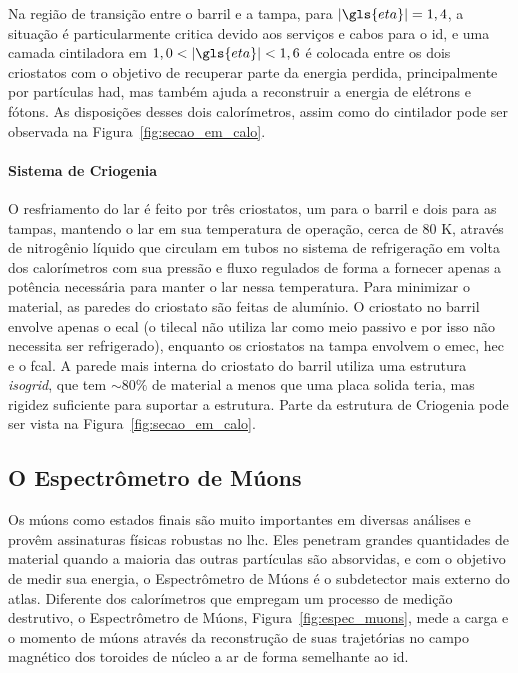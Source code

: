 Na região de transição entre o barril e a tampa, para
$|\gls{eta}| = 1,4$, a situação é particularmente critica devido aos serviços e
cabos para o \gls{id}, e uma camada cintiladora em $1,0<|\gls{eta}|<1,6$ 
é colocada entre os dois criostatos com o objetivo de recuperar parte 
da energia perdida, principalmente por
partículas \gls{had}, mas também ajuda a reconstruir a energia de elétrons e
fótons. As disposições desses dois calorímetros, assim como do cintilador pode 
ser observada na Figura~\ref{fig:secao_em_calo}. 


\paragraph{Sistema de Criogenia}
\label{par:cal_criogenia}

O resfriamento do \gls{lar} é feito por três criostatos, 
um para o barril e dois para as tampas, mantendo o \gls{lar} em sua temperatura
de operação, cerca de 80 K, através de nitrogênio líquido que circulam em tubos
no sistema de refrigeração em volta dos calorímetros com sua pressão e fluxo
regulados de forma a fornecer apenas a potência necessária para manter o
\gls{lar} nessa temperatura. Para minimizar o material, as paredes do criostato
são feitas de alumínio. O criostato no barril envolve apenas o
\gls{ecal} (o \gls{tilecal} não utiliza \gls{lar} como meio passivo e por
isso não necessita ser refrigerado), enquanto os criostatos na tampa envolvem o \gls{emec},
\gls{hec} e o \gls{fcal}. A parede mais interna do criostato do
barril utiliza uma estrutura \emph{isogrid}, que tem $\sim80\%$ de material a
menos que uma placa solida teria, mas rigidez suficiente para suportar a
estrutura. Parte da estrutura de Criogenia pode ser vista na
Figura~\ref{fig:secao_em_calo}.


\subsection{O Espectrômetro de Múons}
\label{ssec:espectometro_muons}


Os múons como estados finais são muito importantes em diversas análises e provêm
assinaturas físicas robustas no \gls{lhc}. 
Eles penetram grandes quantidades de material quando a maioria das outras
partículas são absorvidas, e com o objetivo de medir sua energia, o Espectrômetro
de Múons \cite{muon_tdr} é o subdetector mais externo do \gls{atlas}. Diferente dos calorímetros
que empregam um processo de medição destrutivo, o Espectrômetro de Múons,
Figura~\ref{fig:espec_muons}, mede a carga e o momento de múons através 
da reconstrução de suas trajetórias no 
campo magnético dos toroides de núcleo a ar de forma semelhante ao \gls{id}. 

